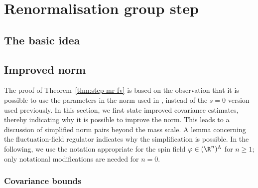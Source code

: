 \chapter{Renormalisation group step}
\label{sec:RGstep}


\section{The basic idea}


\section{Improved norm}
\label{sec:Rpf1}

The proof of Theorem~\ref{thm:step-mr-fv} is based on the observation that
it is possible to use the parameters 
in the norm used in \cite{BS-rg-IE}, instead of the $s=0$ version used
previously.  In this section, we first
state improved covariance estimates, thereby indicating why it is possible
to improve the norm.
This leads to a discussion of simplified norm pairs beyond the mass
scale.  A lemma concerning the fluctuation-field regulator indicates why the
simplification is possible.
In the following, we use the notation appropriate for the spin field
$\varphi \in (\R^n)^\Lambda$ for $n \ge 1$; only notational modifications are needed for
$n=0$.


\subsection{Covariance bounds}
\label{sec:Cbds}

